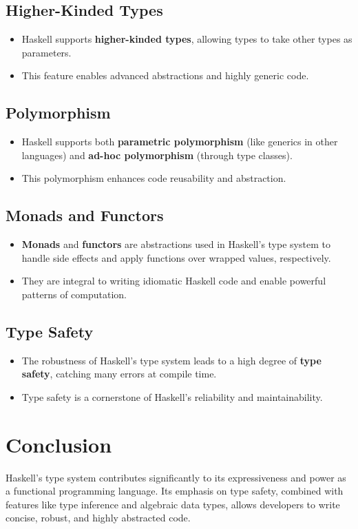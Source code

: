 \subsection{Higher-Kinded Types}
\begin{itemize}
	\item Haskell supports \textbf{higher-kinded types}, allowing types to take other types as parameters.
	\item This feature enables advanced abstractions and highly generic code.
\end{itemize}

\subsection{Polymorphism}
\begin{itemize}
	\item Haskell supports both \textbf{parametric polymorphism} (like generics in other languages) and \textbf{ad-hoc polymorphism} (through type classes).
	\item This polymorphism enhances code reusability and abstraction.
\end{itemize}

\subsection{Monads and Functors}
\begin{itemize}
	\item \textbf{Monads} and \textbf{functors} are abstractions used in Haskell's type system to handle side effects and apply functions over wrapped values, respectively.
	\item They are integral to writing idiomatic Haskell code and enable powerful patterns of computation.
\end{itemize}

\subsection{Type Safety}
\begin{itemize}
	\item The robustness of Haskell's type system leads to a high degree of \textbf{type safety}, catching many errors at compile time.
	\item Type safety is a cornerstone of Haskell’s reliability and maintainability.
\end{itemize}

\section{Conclusion}
Haskell's type system contributes significantly to its expressiveness and power as a functional programming language. Its emphasis on type safety, combined with features like type inference and algebraic data types, allows developers to write concise, robust, and highly abstracted code.
